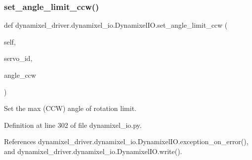 \mbox{\label{classdynamixel__driver_1_1dynamixel__io_1_1_dynamixel_i_o_a2cffd8bdd7929986fca71952250a6dc7}} 
\subsubsection{\texorpdfstring{set\+\_\+angle\+\_\+limit\+\_\+ccw()}{set\_angle\_limit\_ccw()}}
{\footnotesize\ttfamily def dynamixel\+\_\+driver.\+dynamixel\+\_\+io.\+Dynamixel\+I\+O.\+set\+\_\+angle\+\_\+limit\+\_\+ccw (\begin{DoxyParamCaption}\item[{}]{self,  }\item[{}]{servo\+\_\+id,  }\item[{}]{angle\+\_\+ccw }\end{DoxyParamCaption})}

\begin{DoxyVerb}Set the max (CCW) angle of rotation limit.
\end{DoxyVerb}
 

Definition at line 302 of file dynamixel\+\_\+io.\+py.



References dynamixel\+\_\+driver.\+dynamixel\+\_\+io.\+Dynamixel\+I\+O.\+exception\+\_\+on\+\_\+error(), and dynamixel\+\_\+driver.\+dynamixel\+\_\+io.\+Dynamixel\+I\+O.\+write().


